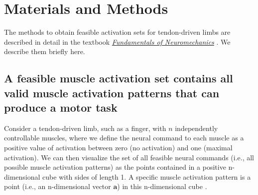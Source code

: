 \documentclass[10pt,letterpaper]{article}
\begin{document}
\section*{Materials and Methods}

The methods to obtain feasible activation sets for tendon-driven limbs are described in detail in the textbook \underline{\emph{Fundamentals of Neuromechanics}} \cite{valero-cuevas2015fundamentals}. We describe them briefly here.
\label{s:methods}
\subsection*{A feasible muscle activation set contains all valid muscle activation patterns that can produce a motor  task}

Consider a tendon-driven limb, such as a finger, with $n$ independently controllable muscles, where we define the neural command to each muscle as a positive value of activation between zero (no activation) and one (maximal activation).
We can then visualize the set of all feasible neural commands (i.e., all possible muscle activation patterns) as the points contained in a positive n-dimensional cube with sides of length 1.  A specific muscle activation pattern is a point (i.e., an n-dimensional vector $\textbf{a}$) in this n-dimensional cube  \cite{Chao1978Graphical, spoor1983balancing, Kuo1993Human, Valero-Cuevas1998Large}.
\end{document}

